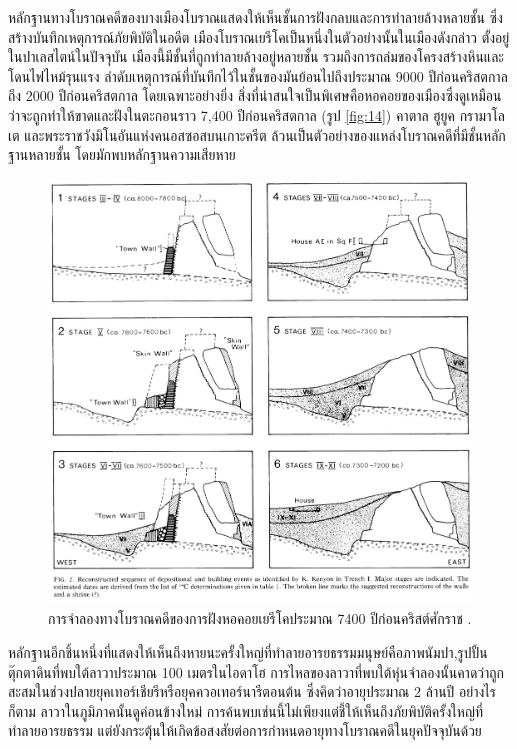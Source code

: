 \documentclass[10pt,twocolumn,letterpaper]{article}
\begin{document}
หลักฐานทางโบราณคดีของบางเมืองโบราณแสดงให้เห็นชั้นการฝังกลบและการทำลายล้างหลายชั้น ซึ่งสร้างบันทึกเหตุการณ์ภัยพิบัติในอดีต เมืองโบราณเยรีโคเป็นหนึ่งในตัวอย่างนั้นในเมืองดังกล่าว ตั้งอยู่ในปาเลสไตน์ในปัจจุบัน เมืองนี้มีชั้นที่ถูกทำลายล้างอยู่หลายชั้น รวมถึงการถล่มของโครงสร้างหินและโดนไฟไหม้รุนแรง \cite{96,97}  ลำดับเหตุการณ์ที่บันทึกไว้ในชั้นของมันย้อนไปถึงประมาณ 9000 ปีก่อนคริสตกาลถึง 2000 ปีก่อนคริสตกาล โดยเฉพาะอย่างยิ่ง สิ่งที่น่าสนใจเป็นพิเศษคือหอคอยของเมืองซึ่งดูเหมือนว่าจะถูกทำให้ขาดและฝังในตะกอนราว 7,400 ปีก่อนคริสตกาล (รูป \ref{fig:14}) \cite{95} คาตาล ฮูยูค \cite{99} กรามาโลเต \cite{98} และพระราชวังมิโนอันแห่งคนอสซอสบนเกาะครีต \cite{100,101} ล้วนเป็นตัวอย่างของแหล่งโบราณคดีที่มีชั้นหลักฐานหลายชั้น โดยมักพบหลักฐานความเสียหาย

\begin{figure}[t]
\begin{center}

\includegraphics[width=1\linewidth]{jericho.jpg}
\end{center}
   \caption{การจำลองทางโบราณคดีของการฝังหอคอยเยรีโคประมาณ 7400 ปีก่อนคริสต์ศักราช \cite{95}.}
\label{fig:14}
\label{fig:onecol}
\end{figure}

หลักฐานอีกชิ้นหนึ่งที่แสดงให้เห็นถึงหายนะครั้งใหญ่ที่ทำลายอารยธรรมมนุษย์คือภาพนัมปา,รูปปั้นตุ๊กตาดินที่พบใต้ลาวาประมาณ 100 เมตรในไอดาโฮ \cite{102,103} การไหลของลาวาที่พบใต้หุ่นจำลองนั้นคาดว่าถูกสะสมในช่วงปลายยุคเทอร์เชียรีหรือยุคควอเทอร์นารีตอนต้น ซึ่งคิดว่าอายุประมาณ 2 ล้านปี อย่างไรก็ตาม ลาวาในภูมิภาคนั้นดูค่อนข้างใหม่ การค้นพบเช่นนี้ไม่เพียงแต่ชี้ให้เห็นถึงภัยพิบัติครั้งใหญ่ที่ทำลายอารยธรรม แต่ยังกระตุ้นให้เกิดข้อสงสัยต่อการกำหนดอายุทางโบราณคดีในยุคปัจจุบันด้วย
\end{document}
